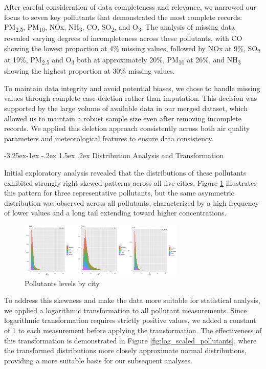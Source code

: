 \documentclass[twoside,11pt]{article}
\makeatletter
\renewcommand\subsubsection{\@startsection{subsubsection}{3}{\z@}%
  {-3.25ex\@plus -1ex \@minus -.2ex}%
  {1.5ex \@plus .2ex}%
  {\normalfont\bfseries\normalsize}}
\makeatother
\begin{document}
After careful consideration of data completeness and relevance, we narrowed our focus to seven key pollutants that demonstrated the most complete records: PM\textsubscript{2.5}, PM\textsubscript{10}, NOx, NH\textsubscript{3}, CO, SO\textsubscript{2}, and O\textsubscript{3}. The analysis of missing data revealed varying degrees of incompleteness across these pollutants, with CO showing the lowest proportion at 4\% missing values, followed by NOx at 9\%, SO\textsubscript{2} at 19\%, PM\textsubscript{2.5} and O\textsubscript{3} both at approximately 20\%, PM\textsubscript{10} at 26\%, and NH\textsubscript{3} showing the highest proportion at 30\% missing values.

To maintain data integrity and avoid potential biases, we chose to handle missing values through complete case deletion rather than imputation. This decision was supported by the large volume of available data in our merged dataset, which allowed us to maintain a robust sample size even after removing incomplete records. We applied this deletion approach consistently across both air quality parameters and meteorological features to ensure data consistency.

\subsubsection{Distribution Analysis and Transformation}

Initial exploratory analysis revealed that the distributions of these pollutants exhibited strongly right-skewed patterns across all five cities. Figure \ref{fig:skewness} illustrates this pattern for three representative pollutants, but the same asymmetric distribution was observed across all pollutants, characterized by a high frequency of lower values and a long tail extending toward higher concentrations.

\begin{figure}[H]
  \centering
  \includegraphics[width=0.7\textwidth]{skewness.png}
  \caption{Pollutants levels by city}
  \label{fig:skewness}
\end{figure}

To address this skewness and make the data more suitable for statistical analysis, we applied a logarithmic transformation to all pollutant measurements. Since logarithmic transformation requires strictly positive values, we added a constant of 1 to each measurement before applying the transformation. The effectiveness of this transformation is demonstrated in Figure \ref{fig:log_scaled_pollutants}, where the transformed distributions more closely approximate normal distributions, providing a more suitable basis for our subsequent analyses.
\end{document}
